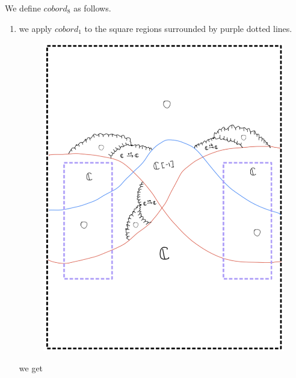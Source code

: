 \pagebreak
We define $cobord_8$ as follows.
\begin{enumerate}[label=(Step \arabic*)]
\item we apply $cobord_1$ to the square regions surrounded by purple dotted lines.

\begin{figure}[H]
    \centering
    \includegraphics[scale = 0.85]{diagrams/cobord8/2.png}
    \caption{}
    \label{fig:your-label}
\end{figure}
\pagebreak
we get


\end{enumerate}
